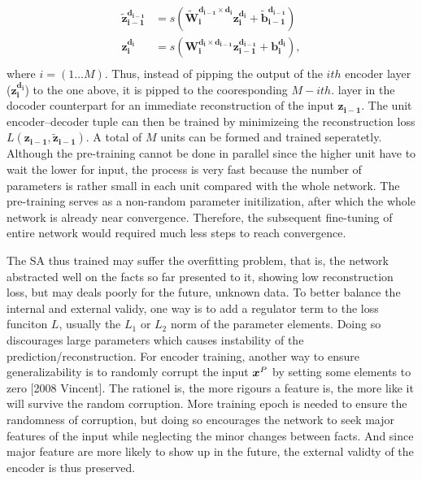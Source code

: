 \begin{equation} \label{eq:unit encoder-decoder}
\begin{split}
  \boldsymbol{\tilde{z}_{i-1}^{d_{i-1}}} &= s(\boldsymbol{\tilde{W}_{i  }^{d_{i-1} \times d_{i  }} z_{i  }^{d_{i  }}}+\boldsymbol{\tilde{b}_{i-1}^{d_{i-1}}}) \\
  \boldsymbol{z_{i  }^{d_{i  }}}         &= s(\boldsymbol{W_{i  }^{d_{i  } \times d_{i-1}} z_{i-1}^{d_{i-1}}}+\boldsymbol{b_{i  }^{d_{i  }}}), \\
\end{split}
\end{equation}
where $i=(1 \ldots M)$. Thus, instead of pipping the output of the $i th$ encoder layer ($\boldsymbol{z_{i  }^{d_{i  }}}$) to the one above, it is pipped to the cooresponding $M-i th.$ layer in the docoder counterpart for an immediate reconstruction of the input $\boldsymbol{z_{i-1}}$. The unit encoder--decoder tuple can then be trained by minimizeing the reconstruction loss $L(\boldsymbol{z_{i-1}},\boldsymbol{\tilde{z}_{i-1}})$. A total of $M$ units can be formed and trained seperatetly. Although the pre-training cannot be done in parallel since the higher unit have to wait the lower for input, the process is very fast because the number of parameters is rather small in each unit compared with the whole network. The pre-training serves as a non-random parameter initilization, after which the whole network is already near convergence. Therefore, the subsequent fine-tuning of entire network would required much less steps to reach convergence.

The SA thus trained may suffer the overfitting problem, that is, the network abstracted well on the facts so far presented to it, showing low reconstruction loss, but may deals poorly for the future, unknown data. To better balance the internal and external validy, one way is to add a regulator term to the loss funciton $L$, usually the $L_1$ or $L_2$ norm of the parameter elements. Doing so discourages large parameters which causes instability of the prediction/reconstruction. For encoder training, another way to ensure generalizability is to randomly corrupt the input $\boldsymbol{x}^P$ by setting some elements to zero [2008 Vincent]. The rationel is, the more rigours a feature is, the more like it will survive the random corruption. More training epoch is needed to ensure the randomness of corruption, but doing so encourages the network to seek major features of the input while neglecting the minor changes between facts. And since major feature are more likely to show up in the future, the external validty of the encoder is thus preserved.

